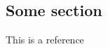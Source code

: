 \documentclass[../main.tex]{subfiles}
\begin{document}
\subsection{Some section}
This is a reference \citep{wallace_immunopathology_2014}
\lipsum[1-1]
\end{document}
